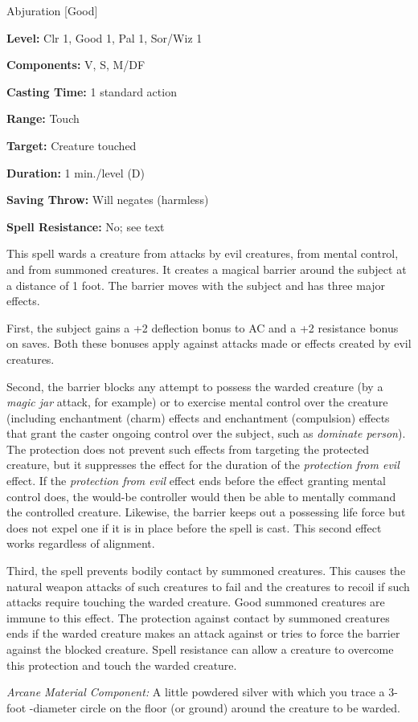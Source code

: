 
Abjuration [Good]

\textbf{Level:} Clr 1, Good 1, Pal 1, Sor/Wiz 1

\textbf{Components:} V, S, M/DF

\textbf{Casting Time:} 1 standard action

\textbf{Range:} Touch

\textbf{Target:} Creature touched

\textbf{Duration:} 1 min./level (D)

\textbf{Saving Throw:} Will negates (harmless)

\textbf{Spell Resistance:} No; see text

This spell wards a creature from attacks by evil creatures, from mental control, 
and from summoned creatures. It creates a magical barrier around the subject at 
a distance of 1 foot. The barrier moves with the subject and has three major effects.

First, the subject gains a +2 deflection bonus to AC and a +2 resistance bonus 
on saves. Both these bonuses apply against attacks made or effects created by evil 
creatures.

Second, the barrier blocks any attempt to possess the warded creature (by a \textit{magic 
jar} attack, for example) or to exercise mental control over the creature (including 
enchantment (charm) effects and enchantment (compulsion) effects that grant the 
caster ongoing control over the subject, such as \textit{dominate person}). The 
protection does not prevent such effects from targeting the protected creature, 
but it suppresses the effect for the duration of the \textit{protection from evil 
}effect. If the \textit{protection from evil} effect ends before the effect granting 
mental control does, the would-be controller would then be able to mentally command 
the controlled creature. Likewise, the barrier keeps out a possessing life force 
but does not expel one if it is in place before the spell is cast. This second 
effect works regardless of alignment.

Third, the spell prevents bodily contact by summoned creatures. This causes the 
natural weapon attacks of such creatures to fail and the creatures to recoil if 
such attacks require touching the warded creature. Good summoned creatures are 
immune to this effect. The protection against contact by summoned creatures ends 
if the warded creature makes an attack against or tries to force the barrier against 
the blocked creature. Spell resistance can allow a creature to overcome this protection 
and touch the warded creature.

\textit{Arcane Material Component:} A little powdered silver with which you trace 
a 3-foot -diameter circle on the floor (or ground) around the creature to be warded.

